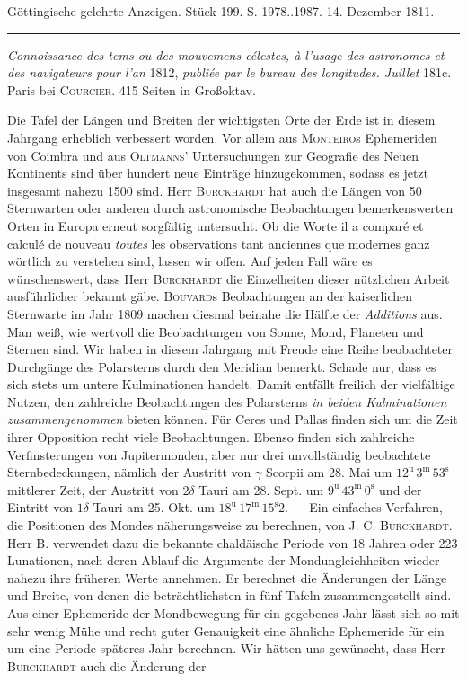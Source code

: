 \clearpage
{}
\hypertarget{native-542-lower}{}\label{native-542-lower}
\begin{center}\small Göttingische gelehrte Anzeigen. Stück 199. S. 1978..1987. 14. Dezember 1811.\\[3pt]\rule{.72\linewidth}{.3pt}\end{center}

\emph{Connoissance des tems ou des mouvemens célestes, à l'usage des astronomes et des navigateurs pour l'an} 1812, \emph{publiée par le bureau des longitudes. Juillet} 181c. Paris bei \textsc{Courcier}. 415 Seiten in Großoktav.

Die Tafel der Längen und Breiten der wichtigsten Orte der Erde ist in diesem Jahrgang erheblich verbessert worden. Vor allem aus \textsc{Monteiro}s Ephemeriden von Coimbra und aus \textsc{Oltmanns}' Untersuchungen zur Geografie des Neuen Kontinents sind über hundert neue Einträge hinzugekommen, sodass es jetzt insgesamt nahezu 1500 sind. Herr \textsc{Burckhardt} hat auch die Längen von 50 Sternwarten oder anderen durch astronomische Beobachtungen bemerkenswerten Orten in Europa erneut sorgfältig untersucht. Ob die Worte il a comparé et calculé de nouveau \emph{toutes} les observations tant anciennes que modernes ganz wörtlich zu verstehen sind, lassen wir offen. Auf jeden Fall wäre es wünschenswert, dass Herr \textsc{Burckhardt} die Einzelheiten dieser nützlichen Arbeit ausführlicher bekannt gäbe. \textsc{Bouvard}s Beobachtungen an der kaiserlichen Sternwarte im Jahr 1809 machen diesmal beinahe die Hälfte der \emph{Additions} aus. Man weiß, wie wertvoll die Beobachtungen von Sonne, Mond, Planeten und Sternen sind. Wir haben in diesem Jahrgang mit Freude eine Reihe beobachteter Durchgänge des Polarsterns durch den Meridian bemerkt. Schade nur, dass es sich stets um untere Kulminationen handelt. Damit entfällt freilich der vielfältige Nutzen, den zahlreiche Beobachtungen des Polarsterns \emph{in beiden Kulminationen zusammengenommen} bieten können. Für Ceres und Pallas finden sich um die Zeit ihrer Opposition recht viele Beobachtungen. Ebenso finden sich zahlreiche Verfinsterungen von Jupitermonden, aber nur drei unvollständig beobachtete Sternbedeckungen, nämlich der Austritt von $\gamma$ Scorpii am 28. Mai um $12^{\mathrm u}\,3^{\mathrm m}\,53^{\mathrm s}$ mittlerer Zeit, der Austritt von $2\delta$ Tauri am 28. Sept. um $9^{\mathrm u}\,43^{\mathrm m}\,0^{\mathrm s}$ und der Eintritt von $1\delta$ Tauri am 25. Okt. um $18^{\mathrm u}\,17^{\mathrm m}\,15^{\mathrm s}2$. --- Ein einfaches Verfahren, die Positionen des Mondes näherungsweise zu berechnen, von J. C. \textsc{Burckhardt}. Herr B. verwendet dazu die bekannte chaldäische Periode von 18 Jahren oder 223 Lunationen, nach deren Ablauf die Argumente der Mondungleichheiten wieder nahezu ihre früheren Werte annehmen. Er berechnet die Änderungen der Länge und Breite, von denen die beträchtlichsten in fünf Tafeln zusammengestellt sind. Aus einer Ephemeride der Mondbewegung für ein gegebenes Jahr lässt sich so mit sehr wenig Mühe und recht guter Genauigkeit eine ähnliche Ephemeride für ein um eine Periode späteres Jahr berechnen. Wir hätten uns gewünscht, dass Herr \textsc{Burckhardt} auch die Änderung der 